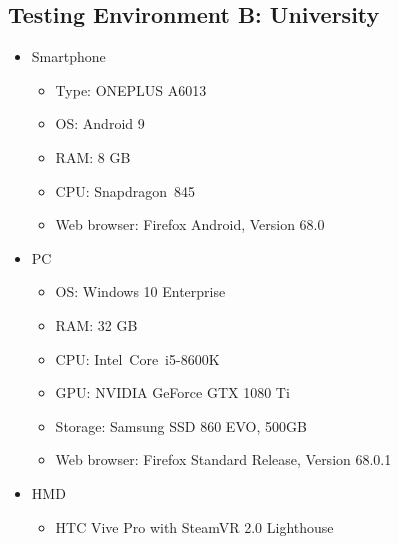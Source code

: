 \begin{appendices}
  \section{Testing Environment B: University}
  \begin{itemize}
    \item Smartphone
    \begin{itemize}
      \item Type: ONEPLUS A6013
      \item \ac{OS}: Android 9
      \item RAM: 8 GB
      \item CPU: Snapdragon\texttrademark\ 845 %
      \item Web browser: Firefox Android, Version 68.0
    \end{itemize}
    \item \ac{PC}
    \begin{itemize}
      \item \ac{OS}: Windows 10 Enterprise
      \item RAM: 32 GB
      \item CPU: Intel\textregistered\ Core\texttrademark\ i5-8600K %
      \item GPU: NVIDIA GeForce GTX 1080 Ti
      \item Storage: Samsung SSD 860 EVO, 500GB
      \item Web browser: Firefox Standard Release, Version 68.0.1
    \end{itemize}
    \item \ac{HMD}
    \begin{itemize}
      \item HTC Vive Pro with SteamVR 2.0 Lighthouse
    \end{itemize}
  \end{itemize}

  
\end{appendices}